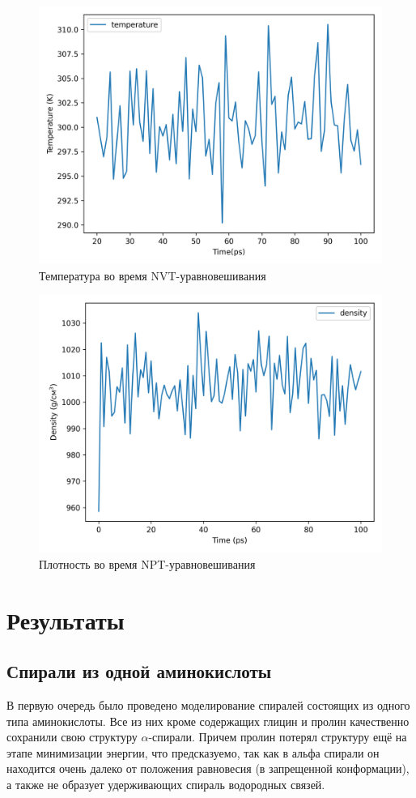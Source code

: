 \documentclass[
11pt,%
tightenlines,%
twoside,%
onecolumn,%
nofloats,%
nobibnotes,%
nofootinbib,%
superscriptaddress,%
noshowpacs,%
centertags]%
{revtex4}
\begin{document}
\begin{figure}[t]
	\centering
	\includegraphics[scale=0.7]{temperature}
	\caption{Температура во время NVT-уравновешивания}
\end{figure}
\begin{figure}[t]
	\centering
	\includegraphics[scale=0.7]{density}
	\caption{Плотность во время NPT-уравновешивания}
\end{figure}

\newpage

\section{Результаты}
\subsection{Спирали из одной аминокислоты}
В первую очередь было проведено моделирование спиралей состоящих из одного типа аминокислоты.
Все из них кроме содержащих глицин и пролин качественно сохранили свою структуру $\alpha$-спирали.
Причем пролин потерял структуру ещё на этапе минимизации энергии,
что предсказуемо, так как в альфа спирали он находится очень далеко от положения равновесия 
(в запрещенной конформации), а также не образует удерживающих спираль водородных связей. \par
\end{document}

